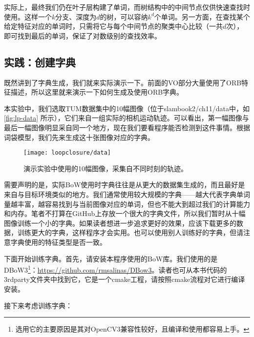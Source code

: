 实际上，最终我们仍在叶子层构建了单词，而树结构中的中间节点仅供快速查找时使用。这样一个$k$分支、深度为$d$的树，可以容纳$k^d$个单词。另一方面，在查找某个给定特征对应的单词时，只需将它与每个中间节点的聚类中心比较（一共$d$次），即可找到最后的单词，保证了对数级别的查找效率。

\subsection{实践：创建字典}
既然讲到了字典生成，我们就来实际演示一下。前面的VO部分大量使用了ORB特征描述，所以这里就来演示一下如何生成及使用ORB字典。

本实验中，我们选取TUM数据集中的10幅图像（位于slambook2/ch11/data中，如\autoref{fig:lp-data} 所示），它们来自一组实际的相机运动轨迹。可以看出，第一幅图像与最后一幅图像明显采自同一个地方，现在我们要看程序能否检测到这件事情。根据词袋模型，我们先来生成这十张图像对应的字典。

\begin{figure}[!htp]
	\centering
	\texttt{[image: loopclosure/data]}
	\caption{演示实验中使用的10幅图像，采集自不同时刻的轨迹。}
	\label{fig:lp-data}
\end{figure}

需要声明的是，实际BoW使用时字典往往是从更大的数据集生成的，而且最好是来自与目标环境类似的地方。我们通常使用较大规模的字典——越大代表字典单词量越丰富，越容易找到与当前图像对应的单词，但也不能大到超过我们的计算能力和内存。笔者不打算在GitHub上存放一个很大的字典文件，所以我们暂时从十幅图像训练一个小的字典。如果读者想进一步追求更好的效果，应该下载更多的数据，训练更大的字典，这样程序才会实用。也可以使用别人训练好的字典，但请注意字典使用的特征类型是否一致。

下面开始训练字典。首先，请安装本程序使用的BoW库。我们使用的是DBoW3\footnote{选用它的主要原因是其对OpenCV3兼容性较好，且编译和使用都容易上手。}：\url{https://github.com/rmsalinas/DBow3}。读者也可从本书代码的3rdparty文件夹中找到它，它是一个cmake工程，请按照cmake流程对它进行编译安装。

接下来考虑训练字典：

